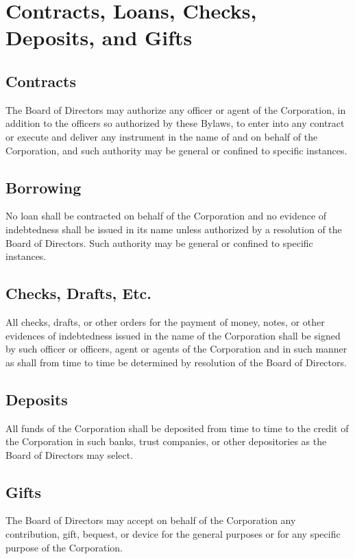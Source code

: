 \chapter{Contracts, Loans, Checks, Deposits, and Gifts}

\section{Contracts}

The Board of Directors may authorize any officer or agent of the Corporation,
in addition to the officers so authorized by these Bylaws, to enter into any
contract or execute and deliver any instrument in the name of and on behalf of
the Corporation, and such authority may be general or confined to specific
instances.

\section{Borrowing}

No loan shall be contracted on behalf of the Corporation and no evidence of
indebtedness shall be issued in its name unless authorized by a resolution of
the Board of Directors. Such authority may be general or confined to specific
instances.

\section{Checks, Drafts, Etc.}

All checks, drafts, or other orders for the payment of money, notes, or other
evidences of indebtedness issued in the name of the Corporation shall be signed
by such officer or officers, agent or agents of the Corporation and in such
manner as shall from time to time be determined by resolution of the Board of
Directors.

\section{Deposits}

All funds of the Corporation shall be deposited from time to time to the credit
of the Corporation in such banks, trust companies, or other depositories as the
Board of Directors may select.

\section{Gifts}

The Board of Directors may accept on behalf of the Corporation any
contribution, gift, bequest, or device for the general purposes or for any
specific purpose of the Corporation.
